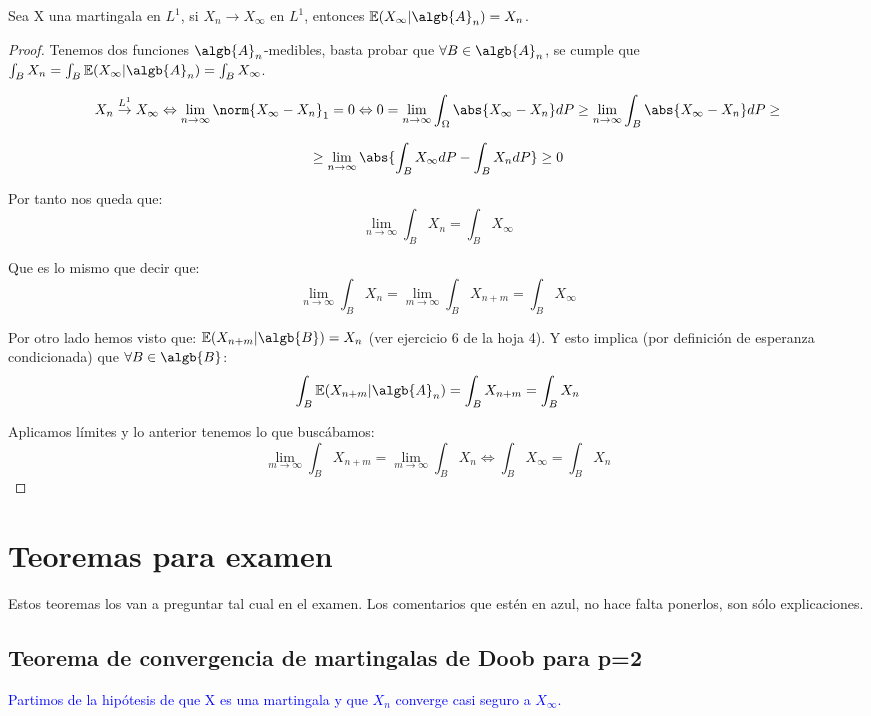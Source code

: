 \documentclass{apuntes}
\begin{document}
\begin{theorem}
Sea X una martingala en $L^1$, si $X_n \rightarrow X_{\infty}$ en $L^1$, entonces $\mathbb{E}(X_{\infty}|\algb{A}_n)=X_n$.
\end{theorem}
\begin{proof}
Tenemos dos funciones $\algb{A}_n$-medibles, basta probar que $\forall B \in \algb{A}_n$, se cumple que $\int_B X_n = \int_B \mathbb{E}(X_{\infty}|\algb{A}_n) = \int_B X_{\infty}$.

\[
X_n \stackrel{L^1}{\rightarrow} X_{\infty} \Leftrightarrow \lim_{n \rightarrow \infty} \norm{X_{\infty}-X_n}_1=0 \Leftrightarrow 0= \lim_{n \rightarrow \infty} \int_{\Omega}\abs{X_{\infty}-X_n}dP \geq \lim_{n \rightarrow \infty} \int_B \abs{X_{\infty}-X_n}dP\geq
\]

\[
\geq \lim_{n \rightarrow \infty} \abs{\int_B X_{\infty}dP- \int_B X_n dP} \geq 0
\]


Por tanto nos queda que:
\[
\lim_{n \rightarrow \infty} \int_B X_n = \int_B X_{\infty}
\]

Que es lo mismo que decir que:
\[
\lim_{n \rightarrow \infty} \int_B X_n = \lim_{m \rightarrow \infty} \int_B X_{n+m} = \int_B X_{\infty}
\]

Por otro lado hemos visto que: $\mathbb{E}(X_{n+m}|\algb{B}) = X_n$ (ver ejercicio 6 de la hoja 4). Y esto implica (por definición de esperanza condicionada) que $\forall B \in \algb{B}$:
\[
\int_B \mathbb{E}(X_{n+m}|\algb{A}_n)=\int_B X_{n+m} = \int_B X_n 
\]

Aplicamos límites y  lo anterior tenemos lo que buscábamos:
\[
\lim_{m \rightarrow \infty}\int_B X_{n+m} = \lim_{m \rightarrow \infty}\int_B X_{n} \Leftrightarrow \int_B X_{\infty} = \int_B X_n
\]


\end{proof}

\chapter{Teoremas para examen}
Estos teoremas los van a preguntar tal cual en el examen. Los comentarios que estén en azul, no hace falta ponerlos, son sólo explicaciones.

\section{Teorema de convergencia de martingalas de Doob para p=2}
\textcolor{blue}{Partimos de la hipótesis de que X es una martingala y que $X_n$ converge casi seguro a $X_{\infty}$.}
\end{document}
